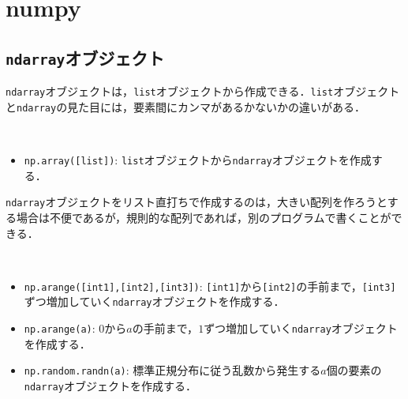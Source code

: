 \section{numpy}

\subsection{\texttt{ndarray}オブジェクト}

\texttt{ndarray}オブジェクトは，\texttt{list}オブジェクトから作成できる．\texttt{list}オブジェクトと\texttt{ndarray}の見た目には，要素間にカンマがあるかないかの違いがある．

\begin{gram}　
\begin{itemize}
\item \texttt{np.array([list])}: \texttt{list}オブジェクトから\texttt{ndarray}オブジェクトを作成する．
\end{itemize}
\end{gram}

\begin{cod}[\texttt{num1.py}]　
}]{code/num1.py}
\vspace{-7pt}
\begin{lstlisting}
x=[1 2 3],type=<class 'numpy.ndarray'>
y=[ 4.1  5.9 -6.3  7. ],type=<class 'numpy.ndarray'>
mylist=[4.1, 5.9, -6.3, 7.0],type=<class 'list'>
\end{lstlisting}
\end{cod}
\vspace{-10pt}

\texttt{ndarray}オブジェクトをリスト直打ちで作成するのは，大きい配列を作ろうとする場合は不便であるが，規則的な配列であれば，別のプログラムで書くことができる．

\begin{gram}　
\begin{itemize}
\item \texttt{np.arange([int1],[int2],[int3])}: \texttt{[int1]}から\texttt{[int2]}の手前まで，\texttt{[int3]}ずつ増加していく\texttt{ndarray}オブジェクトを作成する．
\item \texttt{np.arange(a)}: $0$から$a$の手前まで，$1$ずつ増加していく\texttt{ndarray}オブジェクトを作成する．
\item \texttt{np.random.randn(a)}: 標準正規分布に従う乱数から発生する$a$個の要素の\texttt{ndarray}オブジェクトを作成する．
\end{itemize}
\end{gram}

\begin{cod}[\texttt{num2.py}]　
}]{code/num2.py}
\vspace{-10pt}
\begin{lstlisting}
x=[ 0  2  4  6  8 10 12 14 16 18 20 22 24 26 28]
y=[0 1 2 3 4 5 6 7 8 9]
z=[ 0.41391684 -0.27481322 -0.29993306 -0.64974345  0.63441892  0.66554782 -0.52705262  1.1350932  -0.6862161   1.15003734]
\end{lstlisting}
\end{cod}
\vspace{-10pt}